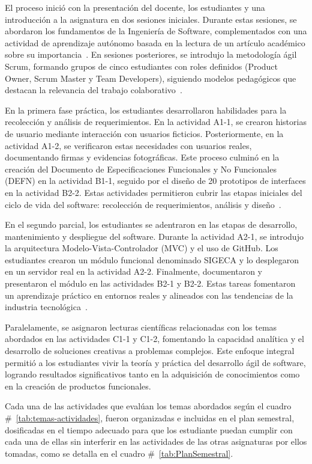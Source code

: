 \documentclass[12pt]{article}
\begin{document}
\begin{multicols}{2}

El proceso inició con la presentación del docente, los estudiantes y una introducción a la asignatura en dos sesiones iniciales. Durante estas sesiones, se abordaron los fundamentos de la Ingeniería de Software, complementados con una actividad de aprendizaje autónomo basada en la lectura de un artículo académico sobre su importancia~\cite{pressman2014software}. En sesiones posteriores, se introdujo la metodología ágil Scrum, formando grupos de cinco estudiantes con roles definidos (Product Owner, Scrum Master y Team Developers), siguiendo modelos pedagógicos que destacan la relevancia del trabajo colaborativo~\cite{kuz2021scrum}.  

En la primera fase práctica, los estudiantes desarrollaron habilidades para la recolección y análisis de requerimientos. En la actividad A1-1, se crearon historias de usuario mediante interacción con usuarios ficticios. Posteriormente, en la actividad A1-2, se verificaron estas necesidades con usuarios reales, documentando firmas y evidencias fotográficas. Este proceso culminó en la creación del Documento de Especificaciones Funcionales y No Funcionales (DEFN) en la actividad B1-1, seguido por el diseño de 20 prototipos de interfaces en la actividad B2-2. Estas actividades permitieron cubrir las etapas iniciales del ciclo de vida del software: recolección de requerimientos, análisis y diseño~\cite{boehm1988spiral}.  

En el segundo parcial, los estudiantes se adentraron en las etapas de desarrollo, mantenimiento y despliegue del software. Durante la actividad A2-1, se introdujo la arquitectura Modelo-Vista-Controlador (MVC) y el uso de GitHub. Los estudiantes crearon un módulo funcional denominado SIGECA y lo desplegaron en un servidor real en la actividad A2-2. Finalmente, documentaron y presentaron el módulo en las actividades B2-1 y B2-2. Estas tareas fomentaron un aprendizaje práctico en entornos reales y alineados con las tendencias de la industria tecnológica~\cite{fitzgerald2006agile}.  

Paralelamente, se asignaron lecturas científicas relacionadas con los temas abordados en las actividades C1-1 y C1-2, fomentando la capacidad analítica y el desarrollo de soluciones creativas a problemas complejos. Este enfoque integral permitió a los estudiantes vivir la teoría y práctica del desarrollo ágil de software, logrando resultados significativos tanto en la adquisición de conocimientos como en la creación de productos funcionales.  


Cada una de las actividades que evalúan los temas abordados según el cuadro \#~\ref{tab:temas-actividades}, fueron organizadas e incluidas en el plan semestral, dosificadas en el tiempo adecuado para que los estudiante puedan cumplir con cada una de ellas sin interferir en las actividades de las otras asignaturas por ellos tomadas, como se detalla en el cuadro \#~\ref{tab:PlanSemestral}. \\

\end{multicols}
\end{document}
